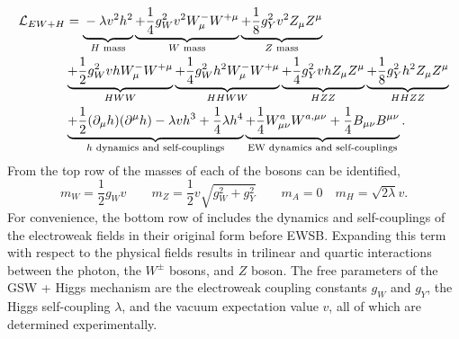 \begin{equation}
    \label{eq:higgs_lagrangian_full}
    \resizebox{.99\hsize}{!}{$
            \begin{aligned}
                \mathcal{L}_{EW+H}
                 & = \underbrace{\vphantom{\frac{}{}} - \lambda v^2 h^2}_{H \text{ mass}}
                \underbrace{+\frac{1}{4} g_W^2 v^2 W^-_\mu W^{+\mu}}_{W \text{ mass}}
                \underbrace{+\frac{1}{8} g_Y^2 v^2 Z_\mu Z^\mu}_{Z \text{ mass}}                                                                                 \\
                 & \underbrace{+\frac{1}{2} g_W^2 v h W^-_\mu W^{+\mu}}_{HWW}
                \underbrace{+\frac{1}{4} g_W^2 h^2 W^-_\mu W^{+\mu}}_{HHWW}
                \underbrace{+\frac{1}{4} g_Y^2 v h Z_\mu Z^\mu}_{HZZ}
                \underbrace{+\frac{1}{8} g_Y^2 h^2 Z_\mu Z^\mu}_{HHZZ}                                                                                           \\
                 & \underbrace{+\frac{1}{2}(\partial_{\mu} h)(\partial^{\mu} h) - \lambda v h^3 + \frac{1}{4}\lambda h^4}_{h\text{ dynamics and self-couplings}}
                \underbrace{+\frac{1}{4} W^a_{\mu\nu} W^{a,\mu\nu} + \frac{1}{4} B_{\mu\nu} B^{\mu\nu}}_{\text{EW dynamics and self-couplings}}.
            \end{aligned}
        $}
\end{equation}
From the top row of  the masses of each of the bosons can be identified,
\begin{equation}
    \label{eq:ew_masses}
    m_W = \frac{1}{2} g_W v
    \qquad
    m_Z = \frac{1}{2} v \sqrt{g_W^2 + g_Y^2}
    \qquad
    m_A = 0
    \quad
    m_H = \sqrt{2 \lambda} v.
\end{equation}
For convenience, the bottom row of  includes the dynamics and self-couplings of the electroweak fields in their original form before \Gls{EWSB}.
Expanding this term with respect to the physical fields results in trilinear and quartic interactions between the photon, the $W^\pm$ bosons, and $Z$ boson.
The free parameters of the \Gls{GSW} + Higgs mechanism are the electroweak coupling constants $g_W$ and $g_Y$, the Higgs self-coupling $\lambda$, and the vacuum expectation value $v$, all of which are determined experimentally.

